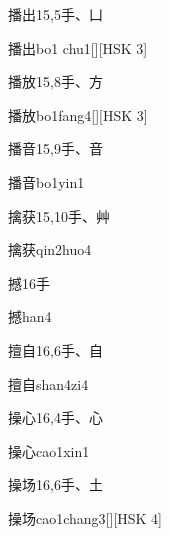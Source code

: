 \begin{entry}{播出}{15,5}{⼿、⼐}
  \begin{phonetics}{播出}{bo1 chu1}[][HSK 3]
  \end{phonetics}
\end{entry}

\begin{entry}{播放}{15,8}{⼿、⽅}
  \begin{phonetics}{播放}{bo1fang4}[][HSK 3]
  \end{phonetics}
\end{entry}

\begin{entry}{播音}{15,9}{⼿、⾳}
  \begin{phonetics}{播音}{bo1yin1}
  \end{phonetics}
\end{entry}

\begin{entry}{擒获}{15,10}{⼿、⾋}
  \begin{phonetics}{擒获}{qin2huo4}
  \end{phonetics}
\end{entry}

\begin{entry}{撼}{16}{⼿}
  \begin{phonetics}{撼}{han4}
  \end{phonetics}
\end{entry}

\begin{entry}{擅自}{16,6}{⼿、⾃}
  \begin{phonetics}{擅自}{shan4zi4}
  \end{phonetics}
\end{entry}

\begin{entry}{操心}{16,4}{⼿、⼼}
  \begin{phonetics}{操心}{cao1xin1}
  \end{phonetics}
\end{entry}

\begin{entry}{操场}{16,6}{⼿、⼟}
  \begin{phonetics}{操场}{cao1chang3}[][HSK 4]
  \end{phonetics}
\end{entry}

